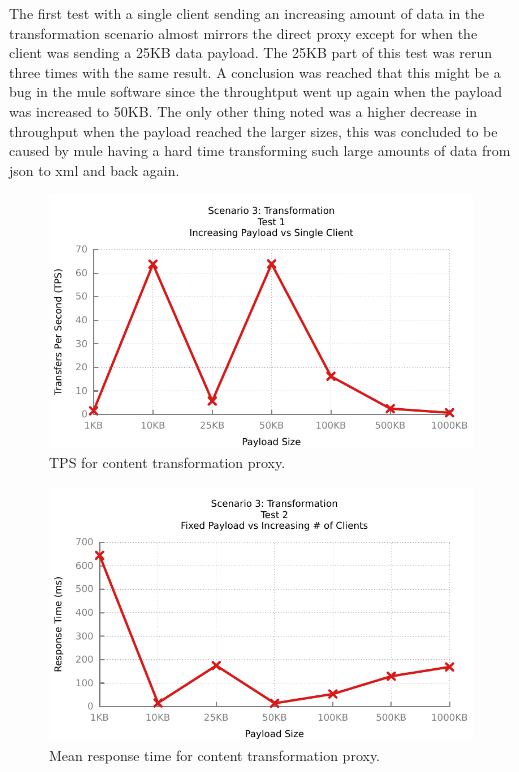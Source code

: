 The first test with a single client sending an increasing amount of data in the transformation scenario almost mirrors the direct proxy except for when the client was sending a 25KB data payload. The 25KB part of this test was rerun three times with the same result.
A conclusion was reached that this might be a bug in the mule software since the throughtput went up again when the payload was increased to 50KB.
The only other thing noted was a higher decrease in throughput when the payload reached the larger sizes, this was concluded to be caused by mule having a hard time transforming such large amounts of data from json to xml and back again.

\begin{figure}[H]
	\caption{TPS for content transformation proxy.}
	\centerline{\includegraphics{img/transform_fu_ip_tps}}
	\label{fig:transform-1-1}
\end{figure}

\begin{figure}[H]
	\label{fig:transform-1-2}
	\caption{Mean response time for content transformation proxy.}
	\centerline{\includegraphics{img/transform_fu_ip_resp}}
\end{figure}


